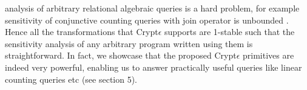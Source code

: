 analysis of arbitrary relational algebraic queries is a hard problem, for example sensitivity of conjunctive counting queries with join operator is unbounded \cite{sensitivity}. Hence all the transformations that Crypt$\epsilon$ supports are 1-stable such that the sensitivity analysis of any arbitrary program written using them is straightforward. In fact, we showcase that the proposed Crypt$\epsilon$ primitives are indeed very powerful, enabling us to answer practically useful queries like linear counting queries etc (see section 5). 

